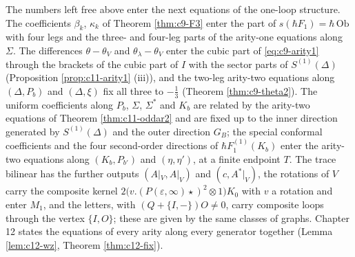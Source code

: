 \begin{remark}
\label{rem:c9-next}
The numbers left free above enter the next equations of the one-loop structure. The coefficients $\beta_k$, $\kappa_k$ of Theorem \ref{thm:c9-F3} enter the part of $s(\hbar F_1)=\hbar\,\mathrm{Ob}$ with four legs and the three- and four-leg parts of the arity-one equations along $\Sigma$. The differences $\theta-\theta_V$ and $\theta_\lambda-\theta_V$ enter the cubic part of \eqref{eq:c9-arity1} through the brackets of the cubic part of $I$ with the sector parts of $S^{(1)}(\Delta)$ (Proposition \ref{prop:c11-arity1} (iii)), and the two-leg arity-two equations along $(\Delta,P_b)$ and $(\Delta,\xi)$ fix all three to $-\tfrac13$ (Theorem \ref{thm:c9-theta2}). The uniform coefficients along $P_b$, $\Sigma$, $\Sigma^*$ and $K_b$ are related by the arity-two equations of Theorem \ref{thm:c11-oddar2} and are fixed up to the inner direction generated by $S^{(1)}(\Delta)$ and the outer direction $G_B$; the special conformal coefficients and the four second-order directions of $\hbar F_1^{(1)}(K_b)$ enter the arity-two equations along $(K_b,P_{b'})$ and $(\eta,\eta')$, at a finite endpoint $T$. The trace bilinear has the further outputs $(A|_V,A|_V)$ and $(c,A^*|_V)$, the rotations of $V$ carry the composite kernel $2\big(v.(P(\varepsilon,\infty)\star)^2\otimes1\big)K_0$ with $v$ a rotation and enter $M_1$, and the letters, with $(Q+\{I,-\})O\neq0$, carry composite loops through the vertex $\{I,O\}$; these are given by the same classes of graphs. Chapter 12 states the equations of every arity along every generator together (Lemma \ref{lem:c12-wz}, Theorem \ref{thm:c12-fix}).
\end{remark}

